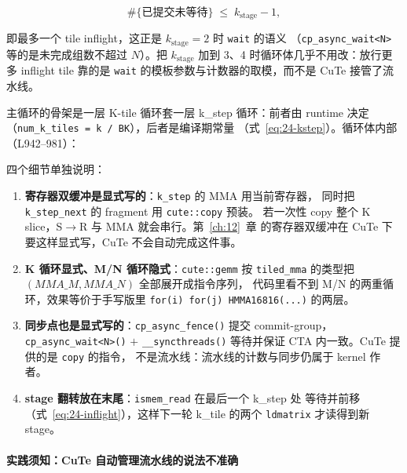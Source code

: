 \begin{equation}
  \#\{\text{已提交未等待}\} \;\le\; k_{\mathrm{stage}}-1 ,
  \label{eq:24-inflight}
\end{equation}

即最多一个 tile inflight，这正是 $k_{\mathrm{stage}}=2$ 时 \texttt{wait} 的语义
（\texttt{cp\_\allowbreak{}async\_\allowbreak{}wait\allowbreak{}<N>} 等的是未完成组数不超过 $N$）。把
$k_{\mathrm{stage}}$ 加到 3、4 时循环体几乎不用改：放行更多 inflight tile 靠的是
\texttt{wait} 的模板参数与计数器的取模，而不是 CuTe 接管了流水线。

主循环的骨架是一层 K-tile 循环套一层 k\_step 循环：前者由 runtime 决定
（\texttt{num\_k\_tiles = k / BK}），后者是编译期常量
（式~\eqref{eq:24-kstep}）。循环体内部（L942--981）：



四个细节单独说明：

\begin{enumerate}
  \item \textbf{寄存器双缓冲是显式写的}：\texttt{k\_step} 的 MMA 用当前寄存器，
        同时把 \texttt{k\_step\_next} 的 fragment 用 \texttt{cute::copy} 预装。
        若一次性 copy 整个 K slice，S$\to$R 与 MMA 就会串行。第~\ref{ch:12}~章
        的寄存器双缓冲在 CuTe 下要这样显式写，CuTe 不会自动完成这件事。
  \item \textbf{K 循环显式、M/N 循环隐式}：\texttt{cute::gemm} 按
        \texttt{tiled\_mma} 的类型把 $(MMA\_M, MMA\_N)$ 全部展开成指令序列，
        代码里看不到 M/N 的两重循环，效果等价于手写版里
        \texttt{for\allowbreak{}(i)\ for\allowbreak{}(j)\ HMMA16816\allowbreak{}(.\allowbreak{}.\allowbreak{}.\allowbreak{})} 的两层。
  \item \textbf{同步点也是显式写的}：\texttt{cp\_\allowbreak{}async\_\allowbreak{}fence\allowbreak{}()} 提交
        commit-group，\texttt{cp\_\allowbreak{}async\_\allowbreak{}wait\allowbreak{}<N>\allowbreak{}()} $+$ \texttt{\_\allowbreak{}\_\allowbreak{}syncthreads\allowbreak{}()}
        等待并保证 CTA 内一致。CuTe 提供的是 \texttt{copy} 的指令，
        不是流水线：流水线的计数与同步仍属于 kernel 作者。
  \item \textbf{stage 翻转放在末尾}：\texttt{ismem\_read} 在最后一个 k\_step 处
        等待并前移（式~\eqref{eq:24-inflight}），这样下一轮 k\_tile 的两个
        \texttt{ldmatrix} 才读得到新 stage。
\end{enumerate}

\paragraph{实践须知：CuTe 自动管理流水线的说法不准确}

